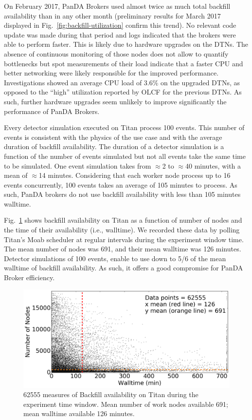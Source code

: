 On February 2017, PanDA Brokers used almost twice as much total backfill
availability than in any other month (preliminary results for March 2017
displayed in Fig.~\ref{fig:backfill-utilization} confirm this trend). No
relevant code update was made during that period and logs indicated that the
brokers were able to perform faster. This is likely due to hardware upgrades
on the DTNs. The absence of continuous monitoring of those nodes does not
allow to quantify bottlenecks but spot measurements of their load indicate
that a faster CPU and better networking were likely responsible for the
improved performance. Investigations showed an average CPU load of 3.6\% on
the upgraded DTNs, as opposed to the ``high'' utilization reported by OLCF
for the previous DTNs. As such, further hardware upgrades seem unlikely to
improve significantly the performance of PanDA Brokers.

Every detector simulation executed on Titan process 100 events. This number
of events is consistent with the physics of the use case and with the average
duration of backfill availability. The duration of a detector simulation is a
function of the number of events simulated but not all events take the same
time to be simulated. One event simulation takes from \(\approx\)2 to
\(\approx\)40 minutes, with a mean of \(\approx\)14 minutes. Considering that
each worker node process up to 16 events concurrently, 100 events takes an
average of 105 minutes to process. As such, PanDA brokers do not use backfill
availability with less than 105 minutes walltime.

Fig.~\ref{fig:backfill-distrib} shows backfill availability on Titan as a
function of number of nodes and the time of their availability (i.e.,
walltime). We recorded these data by polling Titan's Moab scheduler at
regular intervals during the experiment window time. The mean number of nodes
was 691, and their mean walltime was 126 minutes. Detector simulations of 100
events, enable to use down to 5/6 of the mean walltime of backfill
availability. As such, it offers a good compromise for PanDA Broker
efficiency.

\begin{figure}[!t]
    \includegraphics[clip,width=\columnwidth]{figures/titan_backfill_avail.png}
    \vspace{-0.1in}
    \caption{62555 measures of Backfill availability on Titan during the
    experiment time window. Mean number of work nodes available 691; mean
    walltime available 126 minutes.}\label{fig:backfill-distrib}
\end{figure}

